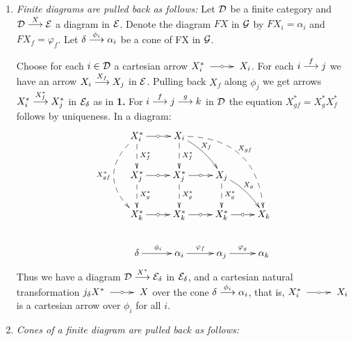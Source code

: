 \begin{sinnadastandard}
\begin{enumerate}
\item \emph{Finite diagrams are pulled back as follows:}
\label{hdpullback}
Let $\mathcal{D}$ be a finite category and  
$\mathcal{D} \overset {X} {\longrightarrow} \mathcal{E}$ a diagram in $\mathcal{E}$. Denote the diagram $FX$ in 
$\mathcal{G}$ by $FX_i = \alpha_i$ and $FX_f = \varphi_f$. Let 
$\delta \overset {\phi_i} {\longrightarrow} \alpha_i$ be a cone of FX in $\mathcal{G}$.


Choose for each $i \in \mathcal{D}$ a cartesian arrow $X_i^* \tocar X_i$. 
For each $i \overset {f} {\longrightarrow} j$ we have an arrow  $ X_i \overset {X_f} {\longrightarrow} X_j $ in $\mathcal{E}$. Pulling back $X_f$ along $\phi_j$ we get arrows  $X_i^* \overset {X_f^*} {\longrightarrow} X_j^*$ in $\mathcal{E}_\delta$ as in {\bf 1.} For 
$i \overset {f} {\longrightarrow} j \overset {g} {\longrightarrow} k$ in $\mathcal{D}$ the equation 
$X_{gf}^* = X_g^* X_f^*$ follows by uniqueness. In a diagram:
%
%
$$
\xymatrix 
    {
     X_i^* \ar[r]|\car
           \ar@{-->}[d]^{X_f^*}
           \ar@{-->}@/_2pc/[dd]_{X_{gf}^*}
   & X_i   \ar@{-->}[d]^{X_f^*}
           \ar@/^0.4pc/[dr]^{\hspace{-1.2ex}X_f}
           \ar@{-->}@/^2.4pc/[drdr]^{\hspace{-1.2ex}X_{gf}}
  \\
     X_j^* \ar[r]|\car 
           \ar@{-->}[d]^{X_g^*}
   & X_j^* \ar[r]|\car
           \ar@{-->}[d]^{X_g^*}
   & X_j   \ar@{-->}[d]^{X_g^*}
           \ar@/^0.4pc/[dr]^{\hspace{-1.2ex}X_g}
  \\ 
     X_k^* \ar[r]|\car
   & X_k^* \ar[r]|\car
   & X_k^* \ar[r]|\car
   & X_k
  \\
     \delta \ar[r]^{\phi_i} 
   & \alpha_i \ar[r]^{\varphi_f}
   & \alpha_j  \ar[r]^{\varphi_g}
   & \alpha_k
    }
$$
Thus we have  a diagram 
$\mathcal{D} \overset {X^*} {\longrightarrow} \mathcal{E}_\delta$ in $\mathcal{E}_\delta$,
and a cartesian natural transformation 
$j_\delta X^* \tocar X$ over the cone $\delta \overset {\phi_i} {\longrightarrow} \alpha_i$, that is, 
$X_i^* \tocar X_i$ is a cartesian arrow over $\phi_i$ for all $i$.



\item \emph{Cones of a finite diagram are pulled back as follows:} 


\end{enumerate}
\end{sinnadastandard}
